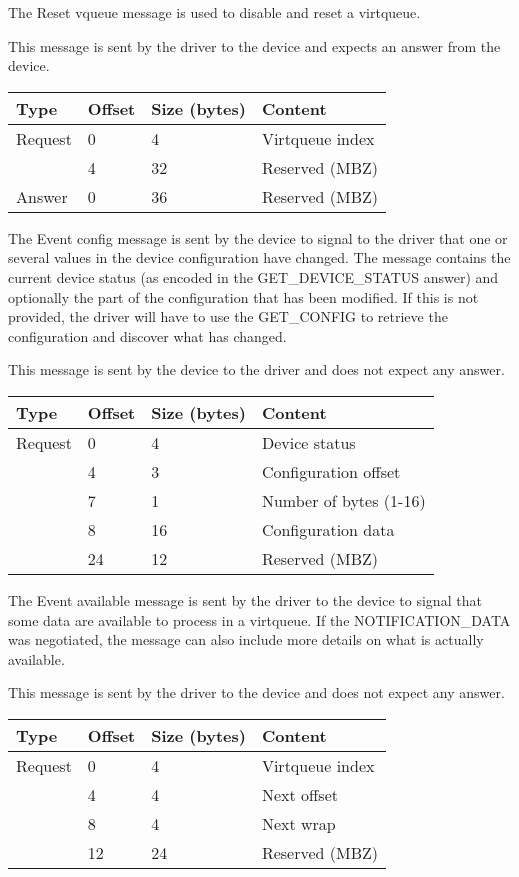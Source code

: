 
The Reset vqueue message is used to disable and reset a virtqueue.

This message is sent by the driver to the device and expects an answer from the
device.

\begin{tabular}{|l|l|l|l|}
\hline
Type & Offset & Size (bytes) & Content \\
\hline \hline
Request & 0 & 4 & Virtqueue index \\
& 4 & 32 & Reserved (MBZ) \\
\hline
Answer & 0 & 36 & Reserved (MBZ) \\
\hline
\end{tabular}


The Event config message is sent by the device to signal to the driver that one
or several values in the device configuration have changed. The message
contains the current device status (as encoded in the GET\_DEVICE\_STATUS
answer) and optionally the part of the configuration that has been modified. If
this is not provided, the driver will have to use the GET\_CONFIG to retrieve
the configuration and discover what has changed.

This message is sent by the device to the driver and does not expect any
answer.

\begin{tabular}{|l|l|l|l|}
\hline
Type & Offset & Size (bytes) & Content \\
\hline \hline
Request & 0 & 4 & Device status \\
& 4 & 3 & Configuration offset \\
& 7 & 1 & Number of bytes (1-16) \\
& 8 & 16 & Configuration data \\
& 24 & 12 & Reserved (MBZ) \\
\hline
\end{tabular}


The Event available message is sent by the driver to the device to signal that
some data are available to process in a virtqueue. If the NOTIFICATION\_DATA
was negotiated, the message can also include more details on what is actually
available.

This message is sent by the driver to the device and does not expect any
answer.

\begin{tabular}{|l|l|l|l|}
\hline
Type & Offset & Size (bytes) & Content \\
\hline \hline
Request & 0 & 4 & Virtqueue index \\
& 4 & 4 & Next offset \\
& 8 & 4 & Next wrap \\
& 12 & 24 & Reserved (MBZ) \\
\hline
\end{tabular}

